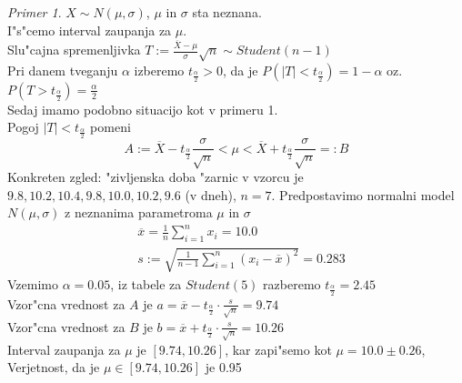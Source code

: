 \documentclass[a4paper,12pt]{article}
\theoremstyle{definition}
\theoremstyle{remark}
\newtheorem*{ex}{Primer}
\begin{document}
\begin{ex}
    $X \sim N(\mu, \sigma)$, $\mu$ in $\sigma$ sta neznana. \\
    I"s"cemo interval zaupanja za $\mu$. \\
    Slu"cajna spremenljivka $T := \frac{\overline{X} - \mu}{\sigma} \sqrt{n} \sim Student(n-1)$ \\
    Pri danem tveganju $\alpha$ izberemo $t_{\frac{\alpha}{2}} > 0$, da je $P(|T| < t_{\frac{\alpha}{2}}) =
    1 - \alpha$ oz. $P(T > t_{\frac{\alpha}{2}}) = \frac{\alpha}{2}$ \\
    Sedaj imamo podobno situacijo kot v primeru 1. \\
    Pogoj $|T| < t_{\frac{\alpha}{2}}$ pomeni
    \begin{equation*}
        A := \overline{X} - t_{\frac{\alpha}{2}} \frac{\sigma}{\sqrt{n}} < \mu <
        \overline{X} + t_{\frac{\alpha}{2}} \frac{\sigma}{\sqrt{n}} =: B
    \end{equation*}
    Konkreten zgled: "zivljenska doba "zarnic v vzorcu je $9.8, 10.2, 10.4, 9.8, 10.0, 10.2, 9.6$ (v dneh),
    $n=7$. Predpostavimo normalni model $N(\mu, \sigma)$ z neznanima parametroma $\mu$ in $\sigma$
    \begin{align*}
        &\overline{x} = \frac{1}{n} \sum_{i=1}^n x_i = 10.0 \\
        &s := \sqrt{\frac{1}{n-1} \sum_{i=1}^n (x_i - \overline{x})^2} = 0.283
    \end{align*}
    Vzemimo $\alpha = 0.05$, iz tabele za $Student(5)$ razberemo $t_{\frac{\alpha}{2}} = 2.45$ \\
    Vzor"cna vrednost za $A$ je $a = \overline{x} - t_{\frac{\alpha}{2}} \cdot \frac{s}{\sqrt{n}} = 9.74$ \\
    Vzor"cna vrednost za $B$ je $b = \overline{x} + t_{\frac{\alpha}{2}} \cdot \frac{s}{\sqrt{n}} = 10.26$ \\
    Interval zaupanja za $\mu$ je $[9.74, 10.26]$, kar zapi"semo kot $\mu = 10.0 \pm 0.26$, Verjetnost, da
    je $\mu \in [9.74, 10.26]$ je 0.95
\end{ex}



\end{document}

